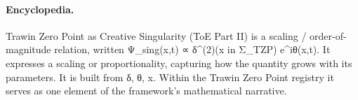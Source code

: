 \paragraph{Encyclopedia.}
Trawin Zero Point as Creative Singularity (ToE Part II) is a scaling / order-of-magnitude relation, written Ψ\_sing(x,t) ∝ δ\textasciicircum{}(2)(x in Σ\_TZP) e\textasciicircum{}iθ(x,t). It expresses a scaling or proportionality, capturing how the quantity grows with its parameters. It is built from δ, θ, x. Within the Trawin Zero Point registry it serves as one element of the framework's mathematical narrative.
